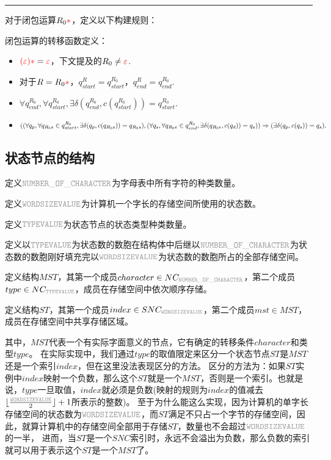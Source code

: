 \documentclass[12pt,a4paper,UTF8]{ctexart}
\newcommand{\var}[1]{\textcolor{lightgray}{\mathtt{#1}}}
\newcommand{\func}[1]{\textcolor{red}{#1}}
\begin{document}
\vspace{2mm}
\hrule
\vspace{2mm}

\qquad 对于闭包运算$R_0\func{*}$，定义以下构建规则：

闭包运算的转移函数定义：
\begin{itemize}
    \item $\func{(}\func{\varepsilon}\func{)}\func{*} = \func{\varepsilon}$，下文提及的$R_0 \ne \func{\varepsilon}$.
    \item 对于$R = R_0\func{*}$，$q_{start}^{R} = q_{start}^{R_0}$，$q_{end}^{R} = q_{end}^{R_0}$.
    \item $\forall q_{end}^{R_0}, \forall q_{start}^{R_0}, \exists \delta(q_{end}^{R_0}, c(q_{start}^{R_0})) = q_{start}^{R_0}.$
    \item $((\forall q_{p}, \forall q_{R_0s} \in q_{start}^{R_0}, \exists \delta(q_{p}, c(q_{R_0s})) = q_{R_0s}), (\forall q_{s}, \forall q_{R_0e} \in q_{end}^{R_0}, \exists \delta(q_{R_0e}, c(q_{d})) =\\ q_{s}))
    \Rightarrow (\exists \delta(q_{p}, c(q_{s})) = q_{s}).$
\end{itemize}

\subsection{状态节点的结构}

\qquad 定义$\var{NUMBER\_OF\_CHARACTER}$为字母表中所有字符的种类数量。

\qquad 定义$\var{WORDSIZEVALUE}$为计算机一个字长的存储空间所使用的状态数。

\qquad 定义$\var{TYPEVALUE}$为状态节点的状态类型种类数量。

\qquad 定义以$\var{TYPEVALUE}$为状态数的数胞在结构体中后继以$\var{NUMBER\_OF\_CHARACTER}$为状态数的数胞刚好填充完以$\var{WORDSIZEVALUE}$为状态数的数胞所占的全部存储空间。

\qquad 定义结构$MST$，其第一个成员$character \in NC_{\var{NUMBER\_OF\_CHARACTER}}$，第二个成员$type \in NC_{\var{TYPEVALUE}}$，成员在存储空间中依次顺序存储。

\qquad 定义结构$ST$，其第一个成员$index \in SNC_{\var{WORDSIZEVALUE}}$，第二个成员$mst \in MST$，成员在存储空间中共享存储区域。

\qquad 其中，$MST$代表一个有实际字面意义的节点，它有确定的转移条件$character$和类型$type$。
在实际实现中，我们通过$type$的取值限定来区分一个状态节点$ST$是$MST$还是一个索引$index$，但在这里没法表现区分的方法。
区分的方法为：如果$ST$实例中$index$映射一个负数，那么这个$ST$就是一个$MST$，否则是一个索引。也就是说，$type$一旦取值，$index$就必须是负数(映射的规则为$index$的值减去$\lfloor\frac{\var{WORDSIZEVALUE}}{2}\rfloor+1$所表示的整数)。
至于为什么能这么实现，因为计算机的单字长存储空间的状态数为$\var{WORDSIZEVALUE}$，而$ST$满足不只占一个字节的存储空间，因此，就算计算机中的存储空间全部用于存储$ST$，数量也不会超过$\var{WORDSIZEVALUE}$的一半，
进而，当$ST$是一个$SNC$索引时，永远不会溢出为负数，那么负数的索引就可以用于表示这个$ST$是一个$MST$了。
\end{document}
